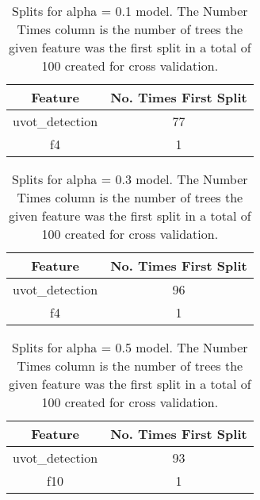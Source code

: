\begin{table}[H]
\begin{center}
\begin{tabular}{cc}
  \hline
Feature & No. Times First Split \\ 
  \hline
uvot\_detection & 77 \\ 
  f4 & 1 \\ 
   \hline
\end{tabular}
\caption{Splits for alpha = 0.1 model. The Number Times column is the number of trees the given feature was the first split in a total of 100 created for cross validation.}
\end{center}
\end{table}
\begin{table}[H]
\begin{center}
\begin{tabular}{cc}
  \hline
Feature & No. Times First Split \\ 
  \hline
uvot\_detection & 96 \\ 
  f4 & 1 \\ 
   \hline
\end{tabular}
\caption{Splits for alpha = 0.3 model. The Number Times column is the number of trees the given feature was the first split in a total of 100 created for cross validation.}
\end{center}
\end{table}
\begin{table}[H]
\begin{center}
\begin{tabular}{cc}
  \hline
Feature & No. Times First Split \\ 
  \hline
uvot\_detection & 93 \\ 
  f10 & 1 \\ 
   \hline
\end{tabular}
\caption{Splits for alpha = 0.5 model. The Number Times column is the number of trees the given feature was the first split in a total of 100 created for cross validation.}
\end{center}
\end{table}
